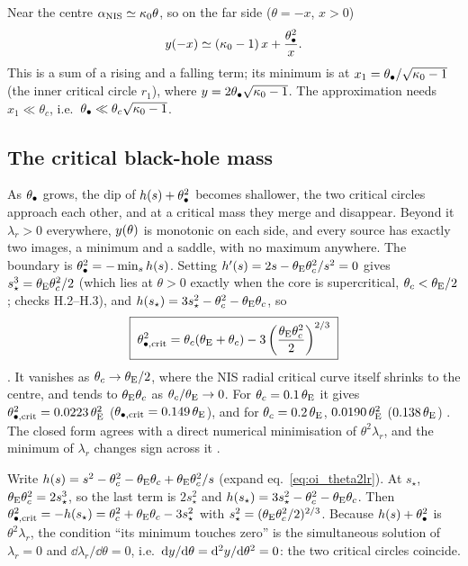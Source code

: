 \begin{derivation}
Near the centre $\alpha_{\rm NIS}\simeq\kappa_0\theta$, so on the far
side ($\theta=-x$, $x>0$)
\[
  y(-x) \simeq (\kappa_0-1)\,x + \frac{\theta_{\bullet}^2}{x}.
\]
This is a sum of a rising and a falling term; its minimum is at
$x_1=\theta_{\bullet}/\sqrt{\kappa_0-1}$ (the inner critical circle $r_1$),
where $y = 2\theta_{\bullet}\sqrt{\kappa_0-1}$.  The approximation needs
$x_1\ll\theta_c$, i.e.\ $\theta_{\bullet}\ll\theta_c\sqrt{\kappa_0-1}$.
\end{derivation}

\subsection{The critical black-hole mass}

As $\theta_{\bullet}$ grows, the dip of $h(s)+\theta_{\bullet}^2$ becomes shallower, the
two critical circles approach each other, and at a critical mass they
merge and disappear.  Beyond it $\lambda_r>0$ everywhere, $y(\theta)$
is monotonic on each side, and every source has exactly two images,
a minimum and a saddle, with no maximum anywhere.  The boundary is
$\theta_{\bullet}^2=-\min_s h(s)$.  Setting $h'(s)=2s-\theta_{\mathrm{E}}\theta_c^2/s^2=0$
gives $s_\star^3=\theta_{\mathrm{E}}\theta_c^2/2$ (which lies at $\theta>0$ exactly
when the core is supercritical, $\theta_c<\theta_{\mathrm{E}}/2$; checks H.2--H.3),
and $h(s_\star)=3s_\star^2-\theta_c^2-\theta_{\mathrm{E}}\theta_c$, so
\begin{equation}
    \boxed{\;
    \theta_{\bullet,\rm crit}^2
    = \theta_c(\theta_{\mathrm{E}}+\theta_c) - 3\left(\frac{\theta_{\mathrm{E}}\theta_c^2}{2}\right)^{2/3}
    \;}
    \label{eq:oi_ucrit}
\end{equation}
.  It vanishes as $\theta_c\to\theta_{\mathrm{E}}/2$, where the NIS
radial critical curve itself shrinks to the centre, and tends to
$\theta_{\mathrm{E}}\theta_c$ as $\theta_c/\theta_{\mathrm{E}}\to0$.
For $\theta_c=0.1\,\theta_{\mathrm{E}}$ it gives $\theta_{\bullet,\rm crit}^2=0.0223\,\theta_{\mathrm{E}}^2$
($\theta_{\bullet,\rm crit}=0.149\,\theta_{\mathrm{E}}$), and for $\theta_c=0.2\,\theta_{\mathrm{E}}$,
$0.0190\,\theta_{\mathrm{E}}^2$ ($0.138\,\theta_{\mathrm{E}}$) .  The closed form agrees
with a direct numerical minimisation of $\theta^2\lambda_r$, and the
minimum of $\lambda_r$ changes sign across it .

\begin{derivation}
Write $h(s)=s^2-\theta_c^2-\theta_{\mathrm{E}}\theta_c+\theta_{\mathrm{E}}\theta_c^2/s$ (expand
eq.~\eqref{eq:oi_theta2lr}).  At $s_\star$, $\theta_{\mathrm{E}}\theta_c^2=2s_\star^3$, so
the last term is $2s_\star^2$ and $h(s_\star)=3s_\star^2-\theta_c^2-\theta_{\mathrm{E}}\theta_c$.
Then $\theta_{\bullet,\rm crit}^2=-h(s_\star)=\theta_c^2+\theta_{\mathrm{E}}\theta_c-3s_\star^2$
with $s_\star^2=(\theta_{\mathrm{E}}\theta_c^2/2)^{2/3}$.  Because $h(s)+\theta_{\bullet}^2$
is $\theta^2\lambda_r$, the condition ``its minimum touches zero'' is
the simultaneous solution of $\lambda_r=0$ and $\dd\lambda_r/\dd\theta=0$,
i.e.\ $\dd y/\dd\theta=\dd^2y/\dd\theta^2=0$: the two critical
circles coincide.
\end{derivation}

